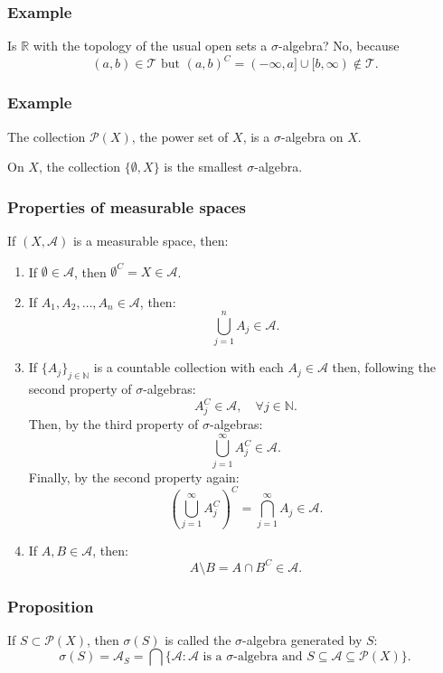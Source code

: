 \documentclass[11pt]{article}
\begin{document}
\subsubsection*{Example}
Is $\mathbb{R}$ with the topology of the usual open sets a $\sigma$-algebra?
No, because
\[(a, b) \in \mathcal{T} \text{ but } (a, b)^C = (-\infty, a] \cup [b, \infty) \notin \mathcal{T}.\]

\subsubsection*{Example}
The collection $\mathcal{P}(X)$, the power set of $X$, is a $\sigma$-algebra on $X$.

On $X$, the collection $\{\emptyset, X\}$ is the smallest $\sigma$-algebra.

\subsubsection{Properties of measurable spaces}
If $(X, \mathcal{A})$ is a measurable space, then:
\begin{enumerate}
    \item If $\emptyset \in \mathcal{A}$, then $\emptyset ^C = X \in \mathcal{A}$.
    \item If $A_1, A_2, \ldots, A_n \in \mathcal{A}$, then:
    \[\bigcup_{j=1}^{n} A_j \in \mathcal{A}.\]
    \item If $\{A_j\}_{j \in \mathbb{N}}$ is a countable collection with each $A_j \in \mathcal{A}$ then, following the second property of $\sigma$-algebras:
    \[A_j^C \in \mathcal{A}, \quad \forall j \in \mathbb{N}.\]
    Then, by the third property of $\sigma$-algebras:
    \[\bigcup_{j=1}^{\infty} A_j^C \in \mathcal{A}.\]
    Finally, by the second property again:
    \[\left(\bigcup_{j=1}^{\infty} A_j^C\right)^C = \bigcap_{j=1}^{\infty} A_j \in \mathcal{A}.\]
    \item If $A, B \in \mathcal{A}$, then:
    \[A \setminus B = A \cap B^C \in \mathcal{A}.\]
\end{enumerate}

\subsubsection{Proposition}
If $S \subset \mathcal{P}(X)$, then $\sigma(S)$ is called the $\sigma$-algebra generated by $S$:
\[\sigma(S) = \mathcal{A}_S = \bigcap \{\mathcal{A} : \mathcal{A} \text{ is a } \sigma\text{-algebra and } S \subseteq \mathcal{A} \subseteq \mathcal{P}(X)\}.\]
\end{document}
